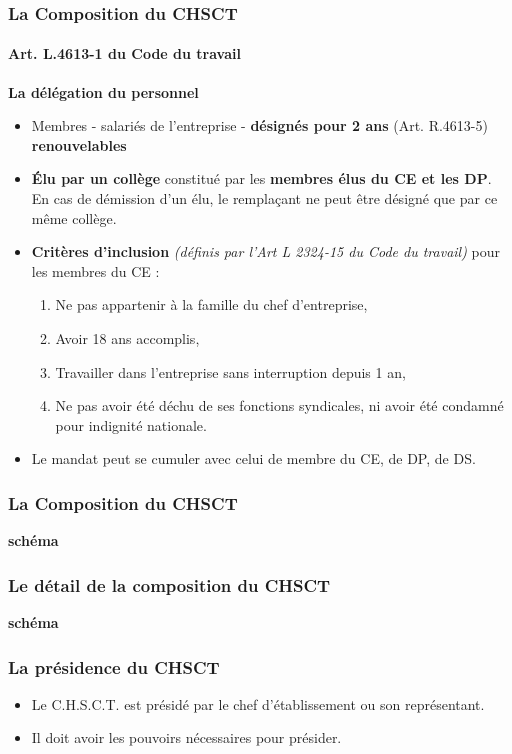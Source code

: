 \documentclass{beamer}
\begin{document}
\begin{frame}
\frametitle{La Composition du CHSCT}
\framesubtitle{Art. L.4613-1 du Code du travail}

\textbf{La délégation du personnel}
\begin{itemize}
\item Membres - salariés de l'entreprise - \textbf{désignés pour 2 ans} (Art. R.4613-5) \textbf{renouvelables}

\item \textbf{Élu par un collège} constitué par les \textbf{membres élus du CE et les DP}. En cas de démission d'un élu, le remplaçant ne peut être désigné que par ce même collège. 

\item \textbf{Critères d’inclusion} \textit{(définis par l'Art L 2324-15 du Code du travail)} pour les membres du CE  :
\begin{enumerate}
        \item Ne pas appartenir à la famille du chef d'entreprise, 

\item Avoir 18 ans accomplis, 

\item Travailler dans l'entreprise sans interruption depuis 1 an, 

\item Ne pas avoir été déchu de ses fonctions syndicales, ni avoir été condamné pour indignité nationale. 
\end{enumerate}
\item Le mandat peut se cumuler avec celui de membre du CE, de DP, de DS.
\end{itemize}
\end{frame}

\begin{frame}
\frametitle{La Composition du CHSCT}

\textbf{schéma}
\end{frame}

\begin{frame}
\frametitle{Le détail de la composition du CHSCT}

\textbf{schéma}
\end{frame}

\begin{frame}
\frametitle{La présidence du CHSCT}


\begin{itemize}
        \item Le C.H.S.C.T. est présidé par le chef d’établissement ou son représentant.

\item Il doit avoir les pouvoirs nécessaires pour présider.
\end{itemize}
\end{frame}
\end{document}
